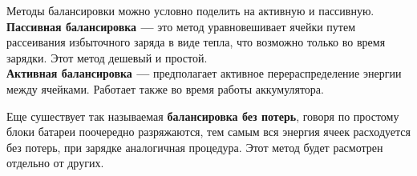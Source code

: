Методы балансировки можно условно поделить на активную и пассивную. \\
\textbf{Пассивная балансировка ---}  это метод уравновешивает ячейки путем рассеивания избыточного заряда 
в виде тепла, что возможно только во время зарядки. 
Этот метод дешевый и простой. \\
\textbf{Активная балансировка ---} предполагает активное перераспределение энергии между ячейками. 
Работает также во время работы аккумулятора. 

Еще сушествует так называемая \textbf{балансировка \glqq без потерь\grqq}, говоря по простому блоки батареи поочередно разряжаются,
тем самым вся энергия ячеек расходуется без потерь, при зарядке аналогичная процедура. Этот метод будет расмотрен отдельно от других.
